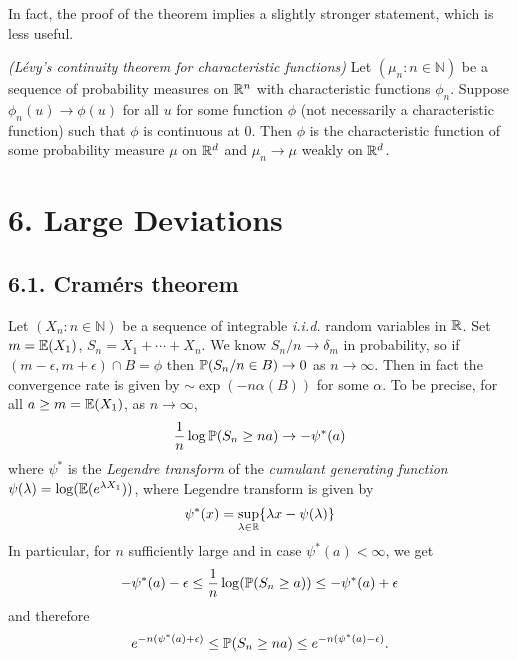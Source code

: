 \documentclass[10pt,a4paper]{report}
\begin{document}
In fact, the proof of the theorem implies a slightly stronger statement, which is less useful.
\s

 \emph{(L\'{e}vy's continuity theorem for characteristic functions)} Let $(\mu_n : n\in \mathbb{N})$ be a sequence of probability measures on $\mathbb{R}^n$ with characteristic functions $\phi_n$. Suppose $\phi_n (u) \rightarrow \phi(u)$ for all $u$ for some function $\phi$ (not necessarily a characteristic function) such that $\phi$ is continuous at $0$. Then $\phi$ is the characteristic function of some probability measure $\mu$ on $\mathbb{R}^d$ and $\mu_n \rightarrow \mu$ weakly on $\mathbb{R}^d$.
\s

\section*{6. Large Deviations}
	
\subsection*{6.1. Cram\'{e}rs theorem}

 Let $(X_n : n\in \mathbb{N})$ be a sequence of integrable \emph{i.i.d.} random variables in $\mathbb{R}$. Set $m = \mathbb{E}(X_1)$, $S_n = X_1 + \cdots + X_n$. We know $S_n / n \rightarrow \delta_m$ in probability, so if $(m-\epsilon, m+ \epsilon) \cap B =\phi$ then $\mathbb{P} (S_n/n \in B) \rightarrow 0$ as $n\rightarrow \infty$. Then in fact the convergence rate is given by $\sim \exp (-n \alpha(B))$ for some $\alpha$. To be precise, for all $a\geq m = \mathbb{E}(X_1)$, as $n\rightarrow \infty$,
\begin{align*}
\frac{1}{n} \log \mathbb{P} (S_n \geq na) \rightarrow -\psi^*(a)
\end{align*}
where $\psi^*$ is the \emph{Legendre transform} of the \emph{cumulant generating function} $\psi (\lambda) = \log (\mathbb{E}(e^{\lambda X_1}))$, where Legendre transform is given by
\begin{align*}
\psi^* (x) = \sup_{\lambda \in \mathbb{R}} \{ \lambda x - \psi(\lambda) \}
\end{align*}
\quad In particular, for $n$ sufficiently large and in case $\psi^{*}(a) < \infty$, we get
\begin{align*}
-\psi^{*}(a) - \epsilon \leq \frac{1}{n} \log (\mathbb{P}(S_n \geq a)) \leq -\psi^{*}(a) + \epsilon 
\end{align*}
and therefore
\begin{align*}
e^{-n(\psi^*(a)+\epsilon)} \leq \mathbb{P} (S_n \geq na) \leq e^{-n(\psi^*(a)-\epsilon)} .
\end{align*}
\s
\end{document}
